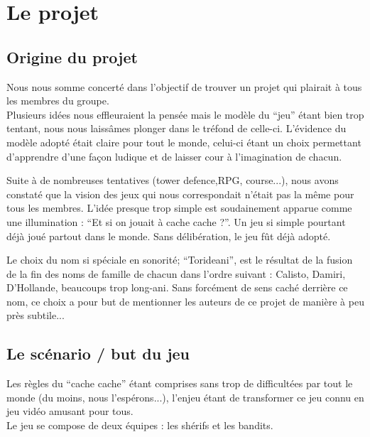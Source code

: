 \documentclass[12pt]{report}
\begin{document}




    \chapter{Le projet}
        \section{Origine du projet}
            Nous nous somme concerté dans l’objectif de trouver un projet qui plairait à tous les membres du groupe. \\ Plusieurs idées nous effleuraient la pensée mais le modèle du “jeu” étant bien trop tentant, nous nous laissâmes plonger dans le tréfond de celle-ci. L’évidence du modèle adopté était claire pour tout le monde, celui-ci étant un choix permettant d’apprendre d’une façon ludique et de laisser cour à l’imagination de chacun.\\ \par Suite à de nombreuses tentatives (tower defence,RPG, course...), nous avons constaté que la vision des jeux qui nous correspondait n’était pas la même pour tous les membres. L’idée presque trop simple est soudainement apparue comme une illumination : “Et si on jouait à cache cache ?”. Un jeu si simple pourtant déjà joué partout dans le monde. Sans délibération, le jeu fût déjà adopté.\\ \par Le choix du nom si spéciale en sonorité; “Torideani”, est le résultat de la fusion de la fin des noms de famille de chacun dans l'ordre suivant : Calisto, Damiri, D’Hollande, beaucoups trop long-ani. Sans forcément de sens caché derrière ce nom, ce choix a pour but de mentionner les auteurs de ce projet de manière à peu près subtile...
        \section{Le scénario / but du jeu}
            Les règles du “cache cache” étant comprises sans trop de difficultées par tout le monde (du moins, nous l'espérons...), l’enjeu étant de transformer ce jeu connu en jeu vidéo amusant pour tous. \\
             
            Le jeu se compose de deux équipes : les shérifs et les bandits. \\
    
\end{document}
